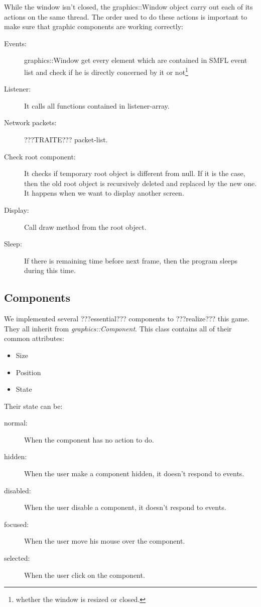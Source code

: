 \documentclass{scrreprt}
\begin{document}
		  While the window isn't closed, the graphics::Window object carry out each of its actions on the same thread. The order used to do these actions is important to make sure that graphic components are working correctly:
		  \begin{description}
		  \item[Events:]{graphics::Window get every element which are contained in SMFL event list and check if he is directly concerned by it or not\footnote{whether the window is resized or closed.}}
		  \item[Listener:]{It calls all functions contained in listener-array.}
		  \item[Network packets:]{???TRAITE??? packet-list.}
		  \item[Check root component:] It checks if temporary root object is different from null. If it is the case, then the old root object is recursively deleted and replaced by the new one. It happens when we want to display another screen.
		  \item[Display:]{Call draw method from the root object.}
		  \item[Sleep:]{If there is remaining time before next frame, then the program sleeps during this time.}
		  \end{description}

		  \subsection{Components}
		  We implemented several ???essential??? components to ???realize??? this game. They all inherit from \emph{graphics::Component}. This class contains all of their common attributes:
		  \begin{itemize}
		  \item{Size}
		  \item{Position}
		  \item{State}
		  \end{itemize}

		  Their state can be:
		  \begin{description}
		  \item[normal:]{When the component has no action to do.}
		  \item[hidden:]{When the user make a component hidden, it doesn't respond to events.}
		  \item[disabled:]{When the user disable a component, it doesn't respond to events.}
		  \item[focused:]{When the user move his mouse over the component.}
		  \item[selected:]{When the user click on the component.}
		  \end{description}
\end{document}
